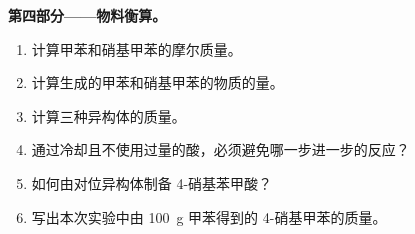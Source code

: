\begin{problem}
\medskip
\noindent\textbf{第四部分——物料衡算。}
\begin{enumerate}[resume]
  \item 计算甲苯和硝基甲苯的摩尔质量。
  \item 计算生成的甲苯和硝基甲苯的物质的量。
  \item 计算三种异构体的质量。
  \item 通过冷却且不使用过量的酸，必须避免哪一步进一步的反应？
  \item 如何由对位异构体制备 4-硝基苯甲酸？
  \item 写出本次实验中由 \qty{100}{g} 甲苯得到的 4-硝基甲苯的质量。
\end{enumerate}
\end{problem}
